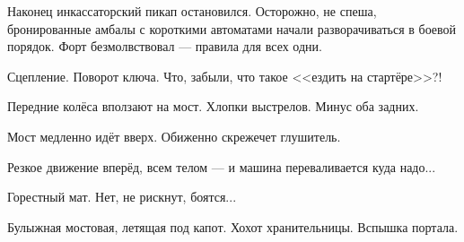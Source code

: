 \emptypar

Наконец инкассаторский пикап остановился.
Осторожно, не спеша, бронированные амбалы с короткими автоматами начали разворачиваться в боевой порядок.
Форт безмолвствовал --- правила для всех одни.

\emptypar

Сцепление. Поворот ключа. Что, забыли, что такое <<ездить на стартёре>>?!

\emptypar

Передние колёса вползают на мост. Хлопки выстрелов. Минус оба задних.

\emptypar

Мост медленно идёт вверх. Обиженно скрежечет глушитель.

\emptypar

Резкое движение вперёд, всем телом --- и машина переваливается куда надо...

\emptypar

Горестный мат. Нет, не рискнут, боятся...

\emptypar

Булыжная мостовая, летящая под капот. Хохот хранительницы. Вспышка портала.
